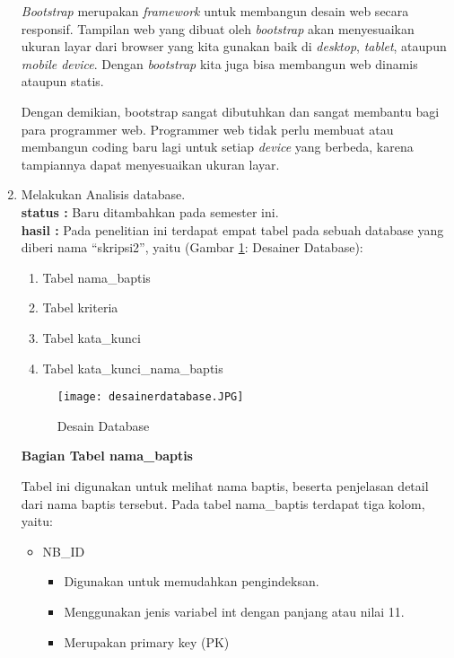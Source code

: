 \documentclass[a4paper,twoside]{article}
\begin{document}
\begin{enumerate}
		
		\textit{Bootstrap} merupakan \textit{framework} untuk membangun desain web secara responsif. Tampilan web yang dibuat oleh \textit{bootstrap} akan menyesuaikan ukuran layar dari browser yang kita gunakan baik di \textit{desktop}, \textit{tablet}, ataupun \textit{mobile device}. Dengan \textit{bootstrap} kita juga bisa membangun web dinamis ataupun statis.
		
		Dengan demikian, bootstrap sangat dibutuhkan dan sangat membantu bagi para programmer web. Programmer web tidak perlu membuat atau membangun coding baru lagi untuk setiap \textit{device} yang berbeda, karena tampiannya dapat menyesuaikan ukuran layar.
		
\item Melakukan Analisis database.\\
{\bf status :} Baru ditambahkan pada semester ini.\\
{\bf hasil :} Pada penelitian ini terdapat empat tabel pada sebuah database yang diberi nama ``skripsi2'', yaitu (Gambar \ref{fig:db4}: Desainer Database):
\begin{enumerate}
	\item Tabel nama\_baptis
	\item Tabel kriteria
	\item Tabel kata\_kunci
	\item Tabel kata\_kunci\_nama\_baptis
\end{enumerate}

	\begin{figure}[htbp]
		\centering
			\texttt{[image: desainerdatabase.JPG]}
			\caption{Desain Database}
		\label{fig:db4}
	\end{figure}
	

\textbf{Bagian Tabel nama\_baptis}

Tabel ini digunakan untuk melihat nama baptis, beserta penjelasan detail dari nama baptis tersebut. %
	Pada tabel nama\_baptis terdapat tiga kolom, yaitu:
	
	
	\begin{itemize}
		\item NB\_ID 
		
		\begin{itemize}
			\item Digunakan untuk memudahkan pengindeksan.
			\item Menggunakan jenis variabel int dengan panjang atau nilai 11.
			\item Merupakan primary key (PK)
			

\end{itemize}
\end{itemize}
\end{enumerate}
\end{document}
